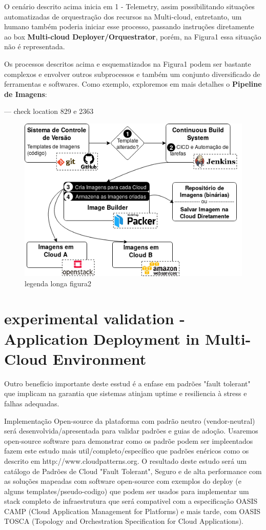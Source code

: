 \documentclass[12pt]{article}
\begin{document}
	O cenário descrito acima inicia em 1 - Telemetry, assim possibilitando situações automatizadas de orquestração dos recursos na Multi-cloud, entretanto, um humano também poderia iniciar esse processo, passando instruções diretamente ao box \textbf{Multi-cloud Deployer/Orquestrator}, porém, na Figura1 essa situação não é representada.  
	
	Os processos descritos acima e esquematizados na Figura1 podem ser bastante complexos e envolver outros subprocessos e também um conjunto diversificado de ferramentas e softwares. Como exemplo, exploremos em mais detalhes o \textbf{Pipeline de Imagens}:
	
	--- check location 829 e 2363
	
		\begin{figure}[H]
			\centering
			\includegraphics[width=0.7\linewidth]{figuras/Figure2.png}
			\caption{legenda longa figura2}
			\label{fig:figure2}
		\end{figure}
	
	\section{experimental validation - Application Deployment in Multi-Cloud Environment}
	
	Outro benefício importante deste esstud é a enfase em padrões "fault tolerant" que implicam na garantia que sistemas atinjam uptime e resiliencia à stress e falhas adequadas. 
	
	Implementação Open-source da plataforma com padrão neutro (vendor-neutral) será desenvolvida/apresentada para validar padrões e guias de adoção. Usaremos open-source software para demonstrar como os padrõe podem ser impleentados fazem este estudo mais util/completo/específico que padrões enéricos como os descrito em http://www.cloudpatterns.org.
	O resultado deste estudo será um catálogo de Padrões de Cloud "Fault Tolerant", Seguro e de alta performance com as soluções mapeadas com software open-source com exemplos do deploy (e alguns templates/pseudo-codigo) que podem ser usados para implementar um stack completo de infraestrutura que será compativel com a especificação OASIS CAMP (Cloud Application Management for Platforms) e mais tarde, com OASIS TOSCA (Topology and Orchestration Specification for Cloud Applications).
	
\end{document}
